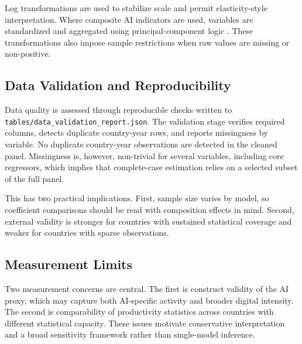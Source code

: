 Log transformations are used to stabilize scale and permit elasticity-style interpretation. Where composite AI indicators are used, variables are standardized and aggregated using principal-component logic \cite{jolliffeCadima2016}. These transformations also impose sample restrictions when raw values are missing or non-positive.

\subsection{Data Validation and Reproducibility}

Data quality is assessed through reproducible checks written to \texttt{tables/data\_validation\_report.json}. The validation stage verifies required columns, detects duplicate country-year rows, and reports missingness by variable. No duplicate country-year observations are detected in the cleaned panel. Missingness is, however, non-trivial for several variables, including core regressors, which implies that complete-case estimation relies on a selected subset of the full panel.

This has two practical implications. First, sample size varies by model, so coefficient comparisons should be read with composition effects in mind. Second, external validity is stronger for countries with sustained statistical coverage and weaker for countries with sparse observations.

\subsection{Measurement Limits}

Two measurement concerns are central. The first is construct validity of the AI proxy, which may capture both AI-specific activity and broader digital intensity. The second is comparability of productivity statistics across countries with different statistical capacity. These issues motivate conservative interpretation and a broad sensitivity framework rather than single-model inference.
